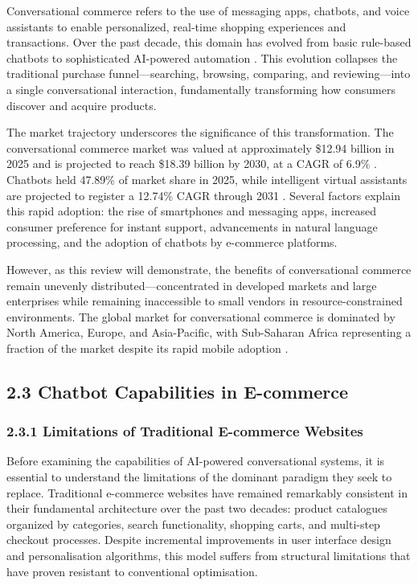 \documentclass[12pt,a4paper]{article}
\begin{document}
Conversational commerce refers to the use of messaging apps, chatbots, and voice assistants to enable personalized, real-time shopping experiences and transactions. Over the past decade, this domain has evolved from basic rule-based chatbots to sophisticated AI-powered automation \citep{lopez2025}. This evolution collapses the traditional purchase funnel---searching, browsing, comparing, and reviewing---into a single conversational interaction, fundamentally transforming how consumers discover and acquire products.

The market trajectory underscores the significance of this transformation. The conversational commerce market was valued at approximately \$12.94 billion in 2025 and is projected to reach \$18.39 billion by 2030, at a CAGR of 6.9\% \citep{marketsandmarkets2025, grandview2025}. Chatbots held 47.89\% of market share in 2025, while intelligent virtual assistants are projected to register a 12.74\% CAGR through 2031 \citep{bloomberg2025, businessresearch2025}. Several factors explain this rapid adoption: the rise of smartphones and messaging apps, increased consumer preference for instant support, advancements in natural language processing, and the adoption of chatbots by e-commerce platforms.

However, as this review will demonstrate, the benefits of conversational commerce remain unevenly distributed---concentrated in developed markets and large enterprises while remaining inaccessible to small vendors in resource-constrained environments. The global market for conversational commerce is dominated by North America, Europe, and Asia-Pacific, with Sub-Saharan Africa representing a fraction of the market despite its rapid mobile adoption \citep{gsma2024}.

\subsection{2.3 Chatbot Capabilities in E-commerce}

\subsubsection{2.3.1 Limitations of Traditional E-commerce Websites}

Before examining the capabilities of AI-powered conversational systems, it is essential to understand the limitations of the dominant paradigm they seek to replace. Traditional e-commerce websites have remained remarkably consistent in their fundamental architecture over the past two decades: product catalogues organized by categories, search functionality, shopping carts, and multi-step checkout processes. Despite incremental improvements in user interface design and personalisation algorithms, this model suffers from structural limitations that have proven resistant to conventional optimisation.
\end{document}
